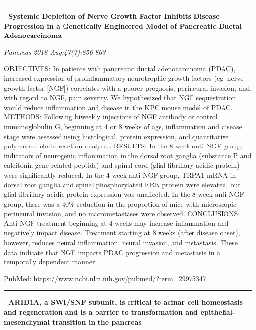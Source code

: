 \documentclass[]{article}
\begin{document}
\begin{center}\rule{0.5\linewidth}{\linethickness}\end{center}

 - \textbf{Systemic Depletion of Nerve Growth Factor Inhibits Disease
Progression in a Genetically Engineered Model of Pancreatic Ductal
Adenocarcinoma}

\emph{Pancreas 2018 Aug;47(7):856-863}

OBJECTIVES: In patients with pancreatic ductal adenocarcinoma (PDAC),
increased expression of proinflammatory neurotrophic growth factors (eg,
nerve growth factor {[}NGF{]}) correlates with a poorer prognosis,
perineural invasion, and, with regard to NGF, pain severity. We
hypothesized that NGF sequestration would reduce inflammation and
disease in the KPC mouse model of PDAC. METHODS: Following biweekly
injections of NGF antibody or control immunoglobulin G, beginning at 4
or 8 weeks of age, inflammation and disease stage were assessed using
histological, protein expression, and quantitative polymerase chain
reaction analyses. RESULTS: In the 8-week anti-NGF group, indicators of
neurogenic inflammation in the dorsal root ganglia (substance P and
calcitonin gene-related peptide) and spinal cord (glial fibrillary
acidic protein) were significantly reduced. In the 4-week anti-NGF
group, TRPA1 mRNA in dorsal root ganglia and spinal phosphorylated ERK
protein were elevated, but glial fibrillary acidic protein expression
was unaffected. In the 8-week anti-NGF group, there was a 40\% reduction
in the proportion of mice with microscopic perineural invasion, and no
macrometastases were observed. CONCLUSIONS: Anti-NGF treatment beginning
at 4 weeks may increase inflammation and negatively impact disease.
Treatment starting at 8 weeks (after disease onset), however, reduces
neural inflammation, neural invasion, and metastasis. These data
indicate that NGF impacts PDAC progression and metastasis in a
temporally dependent manner.

PubMed: \url{https://www.ncbi.nlm.nih.gov/pubmed/?term=29975347}

{}

{}

\begin{center}\rule{0.5\linewidth}{\linethickness}\end{center}

 - \textbf{ARID1A, a SWI/SNF subunit, is critical to acinar cell
homeostasis and regeneration and is a barrier to transformation and
epithelial-mesenchymal transition in the pancreas}
\end{document}
